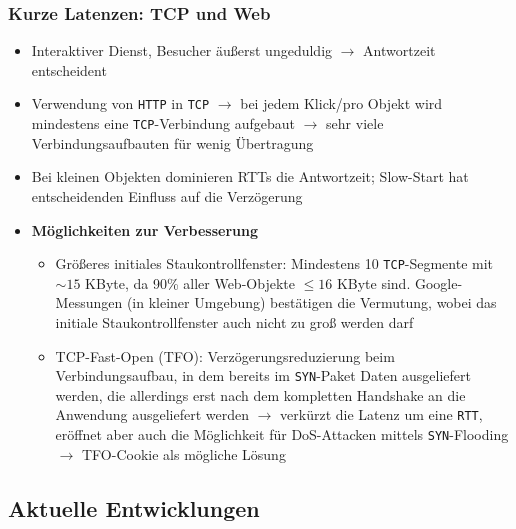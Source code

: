 \subsubsection{Kurze Latenzen: TCP und Web}
\begin{itemize}
	\item Interaktiver Dienst, Besucher äußerst ungeduldig \(\rightarrow\) Antwortzeit entscheident
	\item Verwendung von \texttt{HTTP} in \texttt{TCP} \(\rightarrow\) bei jedem Klick/pro Objekt wird mindestens eine \texttt{TCP}-Verbindung aufgebaut \(\rightarrow\) sehr viele Verbindungsaufbauten für wenig Übertragung
	\item Bei kleinen Objekten dominieren RTTs die Antwortzeit; Slow-Start hat entscheidenden Einfluss auf die Verzögerung
	\item \textbf{Möglichkeiten zur Verbesserung}
	\begin{itemize}
		\item Größeres initiales Staukontrollfenster: Mindestens 10 \texttt{TCP}-Segmente mit \(\sim 15\) KByte, da 90\% aller Web-Objekte \(\le 16\) KByte sind. Google-Messungen (in kleiner Umgebung) bestätigen die Vermutung, wobei das initiale Staukontrollfenster auch nicht zu groß werden darf
		\item TCP-Fast-Open (TFO): Verzögerungsreduzierung beim Verbindungsaufbau, in dem bereits im \texttt{SYN}-Paket Daten ausgeliefert werden, die allerdings erst nach dem kompletten Handshake an die Anwendung ausgeliefert werden \(\rightarrow\) verkürzt die Latenz um eine \texttt{RTT}, eröffnet aber auch die Möglichkeit für DoS-Attacken mittels \texttt{SYN}-Flooding \(\rightarrow\) TFO-Cookie als mögliche Lösung
	\end{itemize}
\end{itemize}


\subsection{Aktuelle Entwicklungen}

